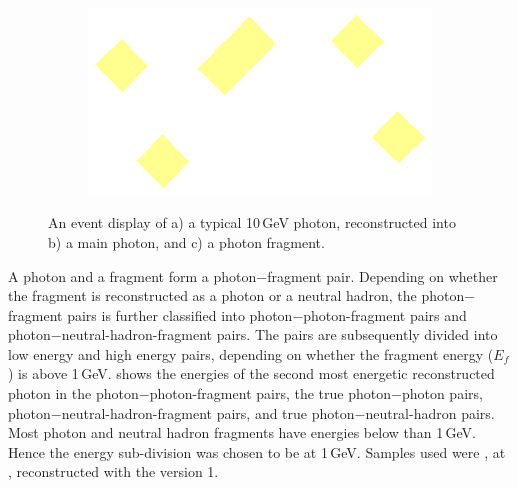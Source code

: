 \begin{figure}[tbph]
\begin{subfigure}[b]{0.3\textwidth}
    \label{fig:photonEvtDspPhotonFragBig}
  \end{subfigure}
  \begin{subfigure}[b]{0.3\textwidth}
    \includegraphics[width=\textwidth]{photon/small}
    \caption{}
    \label{fig:photonEvtDspPhotonFragSmall}
  \end{subfigure}
\caption
{An event display of a) a typical 10\,GeV photon, reconstructed into  b) a main photon,  and c) a photon fragment. }
\label{fig:photonEvtDspPhotonFrag}
\end{figure}




A photon and a fragment form a photon$-$fragment pair.  Depending on whether the fragment is reconstructed as a photon or a neutral hadron, the photon$-$fragment pairs is further classified into photon$-$photon-fragment pairs and photon$-$neutral-hadron-fragment pairs. The pairs are subsequently  divided into low energy and high energy pairs, depending on whether the fragment energy ($E_f$) is above 1\,GeV.  shows the energies of the second most energetic reconstructed photon in the photon$-$photon-fragment pairs, the true photon$-$photon pairs, photon$-$neutral-hadron-fragment pairs, and true photon$-$neutral-hadron pairs. Most photon and neutral hadron fragments have energies below than 1\,GeV. Hence the energy sub-division was chosen to be at 1\,GeV. Samples used were \eeZuds, at , reconstructed with the \pandora version 1.


